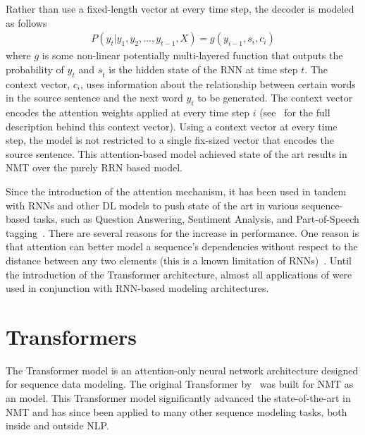 Rather than use a fixed-length vector at every time step, the decoder is modeled as follows 
\begin{align*}
P(y_t \vert y_1, y_2, ..., y_{t-1}, X) = g(y_{i-1}, s_i, c_i)    
\end{align*}
where $g$ is some non-linear potentially multi-layered function that outputs the probability of $y_{t}$ and $s_{\hat{t}}$ is the hidden state of the RNN at time step $t$. The context vector, $c_i$, uses information about the relationship between certain words in the source sentence and the next word $y_t$ to be generated. The context vector encodes the attention weights applied at every time step $i$ (see~\citet{bahdanau2014neural} for the full description behind this context vector). Using a context vector at every time step, the model is not restricted to a single fix-sized vector that encodes the source sentence. This attention-based model achieved state of the art results in NMT over the purely RRN based \ed{} model.

Since the introduction of the attention mechanism, it has been used in tandem with RNNs and other DL models to push state of the art in various sequence-based tasks, such as Question Answering, Sentiment Analysis, and Part-of-Speech tagging~\cite{chaudhari2019attentive}. There are several reasons for the increase in performance. One reason is that attention can better model a sequence's dependencies without respect to the distance between any two elements (this is a known limitation of RNNs)~\cite{vaswani2017attention}. Until the introduction of the Transformer architecture, almost all applications of  were used in conjunction with RNN-based modeling architectures. 


\section{Transformers}
The Transformer model is an attention-only neural network architecture designed for sequence data modeling. The original Transformer by~\citet{vaswani2017attention} was built for NMT as an \ed{} model. This Transformer model significantly advanced the state-of-the-art in NMT and has since been applied to many other sequence modeling tasks, both inside and outside NLP. 
\newcommand{\mb}[1]{\mathbf{#1}}

